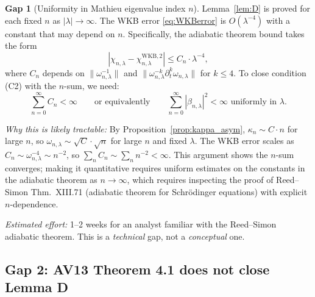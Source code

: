 \documentclass[11pt,a4paper]{article}
\theoremstyle{definition}
\newtheorem{gap}[theorem]{Gap}
\begin{document}
\begin{gap}[Uniformity in Mathieu eigenvalue index $n$]\label{gap:uniform}
Lemma~\ref{lem:D} is proved for each fixed $n$ as $|\lambda| \to \infty$.
The WKB error \eqref{eq:WKBerror} is $O(\lambda^{-4})$ with a constant
that may depend on $n$.  Specifically, the adiabatic theorem bound takes the form
\[
  |\chi_{n,\lambda} - \chi_{n,\lambda}^{\mathrm{WKB},2}| \leq C_n \cdot \lambda^{-4},
\]
where $C_n$ depends on $\|\omega_{n,\lambda}^{-1}\|$ and $\|\omega_{n,\lambda}^{-k}\partial_t^k \omega_{n,\lambda}\|$
for $k \leq 4$.  To close condition (C2) with the $n$-sum, we need:
\begin{equation}\label{eq:Cn_bound}
  \sum_{n=0}^\infty C_n < \infty \qquad \text{or equivalently} \qquad
  \sum_{n=0}^\infty |\beta_{n,\lambda}|^2 < \infty \text{ uniformly in } \lambda.
\end{equation}

\emph{Why this is likely tractable:}
By Proposition~\ref{prop:kappa_asym}, $\kappa_n \sim C \cdot n$ for large $n$,
so $\omega_{n,\lambda} \sim \sqrt{C} \cdot \sqrt{n}$ for large $n$ and fixed $\lambda$.
The WKB error scales as $C_n \sim \omega_{n,\lambda}^{-4} \sim n^{-2}$, so
$\sum_n C_n \sim \sum_n n^{-2} < \infty$.  This argument shows the $n$-sum
converges; making it quantitative requires uniform estimates on the constants in
the adiabatic theorem as $n \to \infty$, which requires inspecting the proof of
Reed--Simon \cite{RS4} Thm.~XIII.71 (adiabatic theorem for Schr\"odinger equations)
with explicit $n$-dependence.

\emph{Estimated effort:} 1--2 weeks for an analyst familiar with the
Reed--Simon adiabatic theorem.  This is a \emph{technical} gap, not a
\emph{conceptual} one.
\end{gap}

\subsection{Gap 2: AV13 Theorem 4.1 does not close Lemma D}
\end{document}
